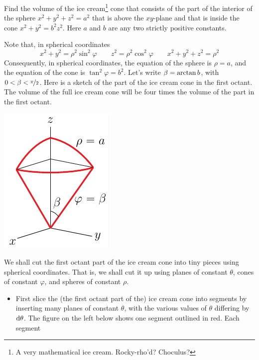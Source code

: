 \begin{eg}\label{eg ice cream cone}
Find the volume of the ice cream\footnote{A very mathematical ice cream. 
Rocky-rho'd? Choculus?} cone that consists of the part of the interior
of the sphere $x^2+y^2+z^2=a^2$ that is above the $xy$-plane and that 
is inside the cone $x^2+y^2=b^2 z^2$. Here $a$ and $b$ are any two 
strictly positive constants.

\soln
Note that, in spherical coordinates
\begin{equation*}
x^2+y^2=\rho^2\sin^2\varphi\qquad
z^2=\rho^2\cos^2\varphi\qquad
x^2+y^2+z^2=\rho^2
\end{equation*}
Consequently, in spherical coordinates, the equation of the sphere is 
$\rho=a$, and the equation of the cone is $\tan^2\varphi = b^2$. Let's 
write $\beta=\arctan b$, with $0<\beta<\nicefrac{\pi}{2}$. Here is a sketch of the
part of the ice cream cone in the first octant. The volume of the full ice
cream cone will be four times the volume of the part in the first octant.
\begin{efig}
\begin{center}
    \includegraphics{iceCream.pdf}
\end{center}
\end{efig}
We shall cut the first octant part of the ice cream cone into tiny pieces using 
spherical coordinates. That is, we shall cut it up using planes of 
constant $\theta$, cones of constant $\varphi$, and spheres of constant $\rho$. 
\begin{itemize}
\item
First slice the (the first octant part of the) ice cream cone into segments 
by inserting many planes of constant $\theta$, with the various values of 
$\theta$ differing by $\mathrm{d}\theta$.
The figure on the left below shows one segment outlined in red. Each segment
\vspace{-\topsep}

\end{itemize}
\end{eg}
